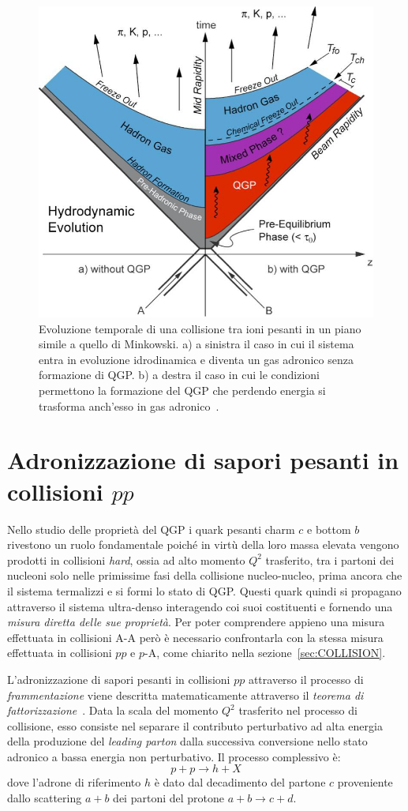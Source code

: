     \begin{figure}[h]
        \centering
        \includegraphics[width=0.65\linewidth]{res/fig/1-chapter/5-TimeEvolQGP.jpg}
        \caption{Evoluzione temporale di una collisione tra ioni pesanti in un piano simile a quello di Minkowski. a) a sinistra il caso in cui il sistema entra in evoluzione idrodinamica e diventa un gas adronico senza formazione di QGP. b) a destra il caso in cui le condizioni permettono la formazione del QGP che perdendo energia si trasforma anch'esso in gas adronico~\cite{ES_2011}.}
        \label{fig:5-time-evol-qgp}
    \end{figure}

\section{Adronizzazione di sapori pesanti in collisioni $pp$}
\label{sec:ADRONIZATIONpp}
    Nello studio delle proprietà del QGP i quark pesanti charm $c$ e bottom $b$ rivestono un ruolo fondamentale poiché in virtù della loro massa elevata vengono prodotti in collisioni \textit{hard}, ossia ad alto momento $Q^2$ trasferito, tra i partoni dei nucleoni solo nelle primissime fasi della collisione nucleo-nucleo, prima ancora che il sistema termalizzi e si formi lo stato di QGP. Questi quark quindi si propagano attraverso il sistema ultra-denso interagendo coi suoi costituenti e fornendo una \textit{misura diretta delle sue proprietà}. Per poter comprendere appieno una misura effettuata in collisioni A-A però è necessario confrontarla con la stessa misura effettuata in collisioni $pp$ e $p$-A, come chiarito nella sezione~\ref{sec:COLLISION}.

    L'adronizzazione di sapori pesanti in collisioni $pp$ attraverso il processo di \textit{frammentazione} viene descritta matematicamente attraverso il \textit{teorema di fattorizzazione}~\cite{CSS_2004}. Data la scala del momento $Q^2$ trasferito nel processo di collisione, esso consiste nel separare il contributo perturbativo ad alta energia della produzione del \textit{leading parton} dalla successiva conversione nello stato adronico a bassa energia non perturbativo. Il processo complessivo è:
    \begin{equation*}
        p + p \to h + X
    \end{equation*}
    dove l'adrone di riferimento $h$ è dato dal decadimento del partone $c$ proveniente dallo scattering $a + b$ dei partoni del protone $a + b \to c + d$.

